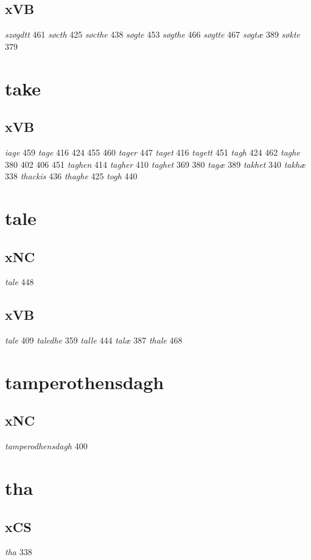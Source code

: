 \documentclass[a4paper,twocolumn]{article}
\begin{document}
\subsection{xVB}
\label{sec:orgf13fa24}
\emph{szøgdtt} 461 \emph{søcth} 425 \emph{søcthe} 438 \emph{søgte} 453 \emph{søgthe} 466 \emph{søgtte} 467 \emph{søgtæ} 389 \emph{søkte} 379 
\section{take}
\label{sec:org5eb46b3}
\subsection{xVB}
\label{sec:org34a56de}
\emph{iage} 459 \emph{tage} 416 424 455 460 \emph{tager} 447 \emph{taget} 416 \emph{tagett} 451 \emph{tagh} 424 462 \emph{taghe} 380 402 406 451 \emph{taghen} 414 \emph{tagher} 410 \emph{taghet} 369 380 \emph{tagæ} 389 \emph{takhet} 340 \emph{takhæ} 338 \emph{thackis} 436 \emph{thaghe} 425 \emph{togh} 440 
\section{tale}
\label{sec:org28ff106}
\subsection{xNC}
\label{sec:orga3a8f36}
\emph{tale} 448 
\subsection{xVB}
\label{sec:org687511b}
\emph{tale} 409 \emph{taledhe} 359 \emph{talle} 444 \emph{talæ} 387 \emph{thale} 468 
\section{tamperothensdagh}
\label{sec:org0646910}
\subsection{xNC}
\label{sec:orgb3f2432}
\emph{tamperodhensdagh} 400 
\section{tha}
\label{sec:orgd6d7ca8}
\subsection{xCS}
\label{sec:org0d95f9d}
\emph{tha} 338 
\end{document}
